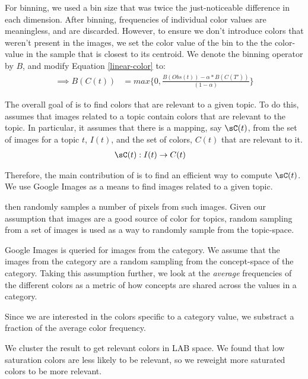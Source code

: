 For binning, we used a bin size that was twice the just-noticeable difference in each dimension. After binning, frequencies of individual color values are meaningless, and are discarded. However, to ensure we don't introduce colors that weren't present in the images, we set the color value of the bin to the the color-value in the sample that is closest to its centroid. We denote the binning operator by $B$, and modify Equation \ref{linear-color} to:
\begin{align}
\label{linear-color-bin}
\implies  B(C(t)) &= max\{0,\frac{B(Obs(t)) - \alpha*B(C(T'))}{(1-\alpha)}\}
\end{align}
 

The overall goal of \system is to find colors that are relevant to a given topic. To do this, \system assumes that images related to a topic contain colors that are relevant to the topic. In particular, it assumes that there is a mapping, say $\sC(t)$, from the set of images for a topic $t$, $I(t)$, and the set of colors, $C(t)$ that are relevant to it. 
\begin{align*}
\sC(t) : I(t) &\rightarrow C(t)
\end{align*} 

Therefore, the main contribution of \system is to find an efficient way to compute $\sC(t)$. 
We use Google Images as a means to find images related to a given topic. 

\system then randomly samples a number of pixels from such images. Given our assumption that images are a good source of color for topics, random sampling from a set of images is used as a way to randomly sample from the topic-space.   

Google Images is queried for images from  the category.
We assume that the images from the category are a random sampling from the concept-space of the category. Taking this assumption further, we look at the {\em average} frequencies of the different colors as a metric of how concepts are shared across the values in a category.



Since we are interested in the colors specific to a category value, we substract a fraction of the average color frequency. 

We cluster the result to get relevant colors in LAB space. We found that low saturation colors are less likely to be relevant, 
so we reweight more saturated colors to be more relevant.
